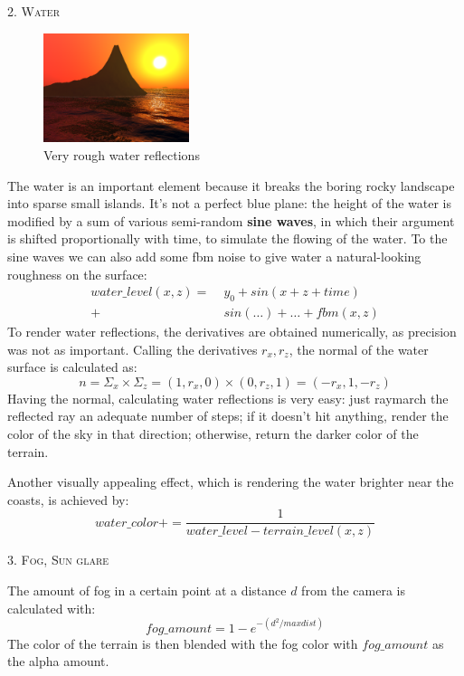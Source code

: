 \documentclass[a4paper,10pt]{article} %
\renewcommand{\b}[1]{%
    {\textbf{#1}}}
\newcommand{\tsection}[1]{%
    {\center \bigbreak \par \hfil \huge \textsc {#1}} \bigbreak \par}
\begin{document}
\newpage


\tsection{2. Water}


\begin{figure}
    \centering
    \includegraphics[width=0.38\textwidth]{water2} \par
    \caption{Very rough water reflections}
\end{figure}


The water is an important element because it breaks the boring rocky landscape into sparse small islands. 
It's not a perfect blue plane: the height of the water is modified by a sum of various semi-random \b{sine waves}, in which their argument is shifted 
proportionally with time, to simulate the flowing of the water. To the sine waves we can also add some fbm noise to give water a natural-looking roughness
on the surface:
\begin{align*}
    water\_level(x, z) =& \; y_0 + sin(x + z + time) \\
                       +& \; sin(\ldots) + \ldots + fbm(x, z)
\end{align*}
To render water reflections, the derivatives are obtained numerically, as precision was not as important.
Calling the derivatives $r_x, r_z$, the normal of the water surface  is calculated as:
\[
    n =  \Sigma_x \times \Sigma_z = (1, r_x, 0) \times (0, r_z, 1)  = (-r_x, 1, -r_z)
\]
Having the normal, calculating water reflections is very easy: just raymarch the reflected ray an adequate number of steps; if it doesn't hit anything,
render the color of the sky in that direction; otherwise, return the darker color of the terrain.

Another visually appealing effect, which is rendering the water brighter near the coasts, is achieved by:
\[
    water\_color += \frac{1}{water\_level - terrain\_level(x, z)}
\]


\tsection{3. Fog, Sun glare}
The amount of fog in a certain point at a distance $d$ from the camera is calculated with:
\[
    fog\_amount = 1 - e^{-(d^2/maxdist)}
\]
The color of the terrain is then blended with the fog color with $fog\_amount$ as the alpha amount.
\end{document}
